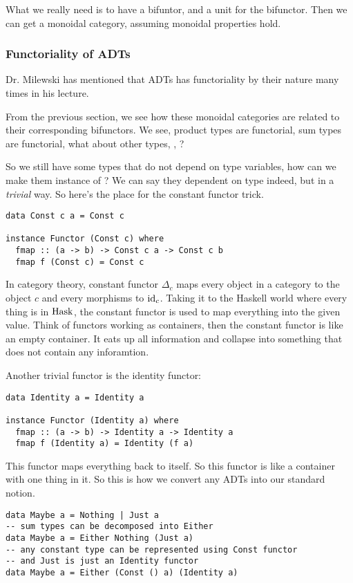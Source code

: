 What we really need is to have a bifuntor, and a unit for the bifunctor. Then we
can get a monoidal category, assuming monoidal properties hold.

\subsubsection{Functoriality of ADTs}

Dr. Milewski has mentioned that ADTs has functoriality by their nature many
times in his lecture.

From the previous section, we see how these monoidal categories are related to
their corresponding bifunctors. We see, product types are functorial, sum
types are functorial, what about other types, , ?

So we still have some types that do not depend on type variables, how can we
make them instance of ? We can say they dependent on type indeed,
but in a \emph{trivial} way. So here's the place for the constant functor trick.

\begin{lstlisting}
data Const c a = Const c

instance Functor (Const c) where
  fmap :: (a -> b) -> Const c a -> Const c b
  fmap f (Const c) = Const c
\end{lstlisting}

In category theory, constant functor $\Delta_c$ maps every object in a category
to the object $c$ and every morphisms to $\mathrm{id}_c$. Taking it to the Haskell world
where every thing is in $\mathrm{Hask}$, the constant functor is used to map everything
into the given value. Think of functors working as containers, then the constant
functor is like an empty container. It eats up all information and collapse into
something that does not contain any inforamtion.

Another trivial functor is the identity functor:

\begin{lstlisting}
data Identity a = Identity a

instance Functor (Identity a) where
  fmap :: (a -> b) -> Identity a -> Identity a
  fmap f (Identity a) = Identity (f a)
\end{lstlisting}

This functor maps everything back to itself. So this functor is like a container
with one thing in it. So this is how we convert any ADTs into our standard
notion.

\begin{lstlisting}
data Maybe a = Nothing | Just a
-- sum types can be decomposed into Either
data Maybe a = Either Nothing (Just a)
-- any constant type can be represented using Const functor
-- and Just is just an Identity functor
data Maybe a = Either (Const () a) (Identity a)
\end{lstlisting}

